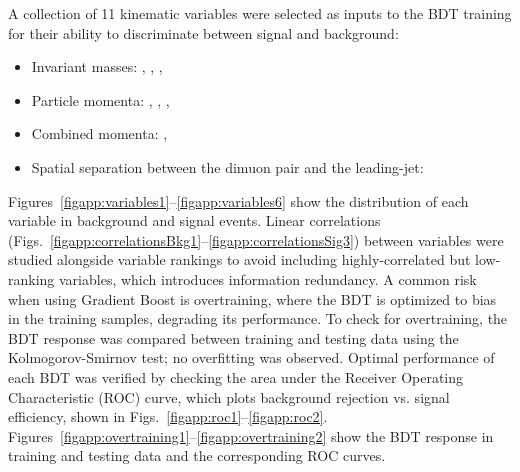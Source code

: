 A collection of 11 kinematic variables were selected as inputs to the BDT training for their ability to discriminate between signal and background: 
\begin{itemize}
    \item Invariant masses: \Muu, \Muujj, \MujOne, \MujTwo
    \item Particle momenta: \ptof{\PmuOne}, \ptof{\PmuTwo}, \ptof{\PjOne}, \ptof{\PjTwo}
    \item Combined momenta: \ST, \MET
    \item Spatial separation between the dimuon pair and the leading-\pt jet: \DRof{\PmuOne+\PmuTwo}{\PjOne}
\end{itemize}
Figures~\ref{figapp:variables1}--\ref{figapp:variables6} show the distribution of each variable in background and signal events. Linear correlations (Figs.~\ref{figapp:correlationsBkg1}--\ref{figapp:correlationsSig3}) between variables were studied alongside variable rankings to avoid including highly-correlated but low-ranking variables, which introduces information redundancy. A common risk when using Gradient Boost is overtraining, where the BDT is optimized to bias in the training samples, degrading its performance. To check for overtraining, the BDT response was compared between training and testing data using the Kolmogorov-Smirnov test; no overfitting was observed. Optimal performance of each BDT was verified by checking the area under the Receiver Operating Characteristic (ROC) curve, which plots background rejection vs. signal efficiency, shown in Figs.~\ref{figapp:roc1}--\ref{figapp:roc2}. Figures~\ref{figapp:overtraining1}--\ref{figapp:overtraining2} show the BDT response in training and testing data and the corresponding ROC curves.

